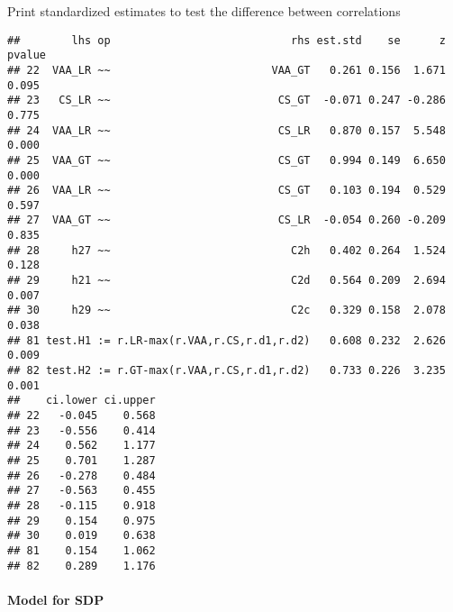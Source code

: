 \documentclass[
]{article}
\newenvironment{Shaded}{\begin{snugshade}}{\end{snugshade}}
\newcommand{\KeywordTok}[1]{\textcolor[rgb]{0.13,0.29,0.53}{\textbf{#1}}}
\newcommand{\NormalTok}[1]{#1}
\newcommand{\OperatorTok}[1]{\textcolor[rgb]{0.81,0.36,0.00}{\textbf{#1}}}
\newcommand{\StringTok}[1]{\textcolor[rgb]{0.31,0.60,0.02}{#1}}
\begin{document}
Print standardized estimates to test the difference between correlations

\begin{Shaded}
\end{Shaded}

\begin{verbatim}
##        lhs op                            rhs est.std    se      z pvalue
## 22  VAA_LR ~~                         VAA_GT   0.261 0.156  1.671  0.095
## 23   CS_LR ~~                          CS_GT  -0.071 0.247 -0.286  0.775
## 24  VAA_LR ~~                          CS_LR   0.870 0.157  5.548  0.000
## 25  VAA_GT ~~                          CS_GT   0.994 0.149  6.650  0.000
## 26  VAA_LR ~~                          CS_GT   0.103 0.194  0.529  0.597
## 27  VAA_GT ~~                          CS_LR  -0.054 0.260 -0.209  0.835
## 28     h27 ~~                            C2h   0.402 0.264  1.524  0.128
## 29     h21 ~~                            C2d   0.564 0.209  2.694  0.007
## 30     h29 ~~                            C2c   0.329 0.158  2.078  0.038
## 81 test.H1 := r.LR-max(r.VAA,r.CS,r.d1,r.d2)   0.608 0.232  2.626  0.009
## 82 test.H2 := r.GT-max(r.VAA,r.CS,r.d1,r.d2)   0.733 0.226  3.235  0.001
##    ci.lower ci.upper
## 22   -0.045    0.568
## 23   -0.556    0.414
## 24    0.562    1.177
## 25    0.701    1.287
## 26   -0.278    0.484
## 27   -0.563    0.455
## 28   -0.115    0.918
## 29    0.154    0.975
## 30    0.019    0.638
## 81    0.154    1.062
## 82    0.289    1.176
\end{verbatim}

\newpage

\hypertarget{model-for-sdp}{%
\paragraph{Model for SDP}\label{model-for-sdp}}
\end{document}
